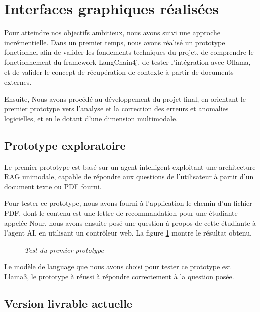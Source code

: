 \documentclass[12pt,a4paper]{report}
\begin{document}
	\section{Interfaces graphiques réalisées}
	
	Pour atteindre nos objectifs ambitieux, nous avons suivi une approche incrémentielle. Dans un premier temps, nous avons réalisé un prototype fonctionnel afin de valider les fondements techniques du projet, de comprendre le fonctionnement du framework LangChain4j, de tester l’intégration avec Ollama, et de valider le concept de récupération de contexte à partir de documents externes.
	
	Ensuite, Nous avons procédé au développement du projet final, en orientant le premier prototype vers l'analyse et la correction des erreurs et anomalies logicielles, et en le dotant d'une dimension multimodale.
	
	\subsection{Prototype exploratoire}
	
	Le premier prototype est basé sur un agent intelligent exploitant une architecture RAG unimodale, capable de répondre aux questions de l’utilisateur à partir d’un document texte ou PDF fourni.
	
	Pour tester ce prototype, nous avons fourni à l'application le chemin d'un fichier PDF, dont le contenu est une lettre de recommandation pour une étudiante appelée Nour, nous avons ensuite posé une question à propos de cette étudiante à l'agent AI, en utilisant un contrôleur web. La figure \ref{fig:test-rag} montre le résultat obtenu.
	
	\begin{figure}[H]
		\centering
		\caption{\textit{Test du premier prototype}}
		\label{fig:test-rag}
	\end{figure}
	
	Le modèle de language que nous avons choisi pour tester ce prototype est Llama3, le prototype à réussi à répondre correctement à la question posée.
	
	\subsection{Version livrable actuelle}
	
\end{document}

